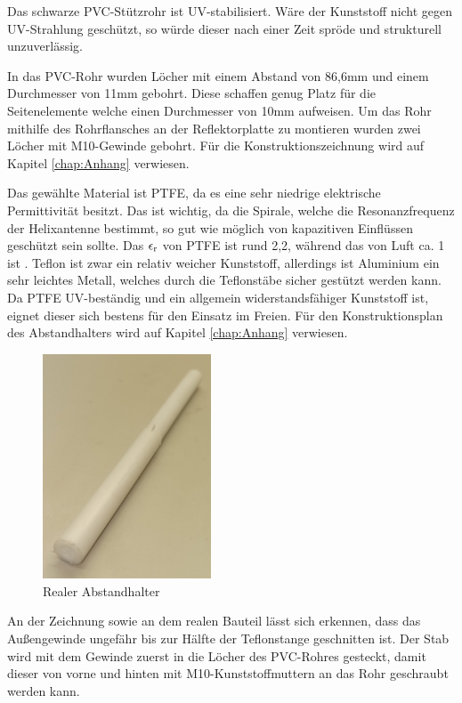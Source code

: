 Das schwarze PVC-Stützrohr ist UV-stabilisiert. Wäre der Kunststoff nicht gegen UV-Strahlung geschützt, so würde dieser nach einer Zeit spröde und strukturell unzuverlässig.

In das PVC-Rohr wurden Löcher mit einem Abstand von 86,6mm und einem Durchmesser von 11mm gebohrt. Diese schaffen genug Platz für die Seitenelemente welche einen Durchmesser von 10mm aufweisen. Um das Rohr mithilfe des Rohrflansches an der Reflektorplatte zu montieren wurden zwei Löcher mit M10-Gewinde gebohrt. Für die Konstruktionszeichnung wird auf Kapitel \ref{chap:Anhang} verwiesen.

Das gewählte Material ist PTFE, da es eine sehr niedrige elektrische Permittivität besitzt. Das ist wichtig, da die Spirale, welche die Resonanzfrequenz der Helixantenne bestimmt, so gut wie möglich von kapazitiven Einflüssen geschützt sein sollte. Das $\epsilon\textsubscript{r}$ von PTFE ist rund 2,2, während das von Luft ca. 1 ist \cite{lipinski_polytetrafluorethylen_nodate,noauthor_dielektrizitatskonstante_nodate}. Teflon ist zwar ein relativ weicher Kunststoff, allerdings ist Aluminium ein sehr leichtes Metall, welches durch die Teflonstäbe sicher gestützt werden kann. Da PTFE UV-beständig und ein allgemein widerstandsfähiger Kunststoff ist, eignet dieser sich bestens für den Einsatz im Freien. Für den Konstruktionsplan des Abstandhalters wird auf Kapitel \ref{chap:Anhang} verwiesen.

\begin{figure}[h!]
	\centering
	\includegraphics[width=5cm]{../ref/Abstandhalter-real.jpg}
	\caption{Realer Abstandhalter}
	\label{fig:Abstandhalter-real}
\end{figure}

An der Zeichnung sowie an dem realen Bauteil lässt sich erkennen, dass das Außengewinde ungefähr bis zur Hälfte der Teflonstange geschnitten ist. Der Stab wird mit dem Gewinde zuerst in die Löcher des PVC-Rohres gesteckt, damit dieser von vorne und hinten mit M10-Kunststoffmuttern an das Rohr geschraubt werden kann.

